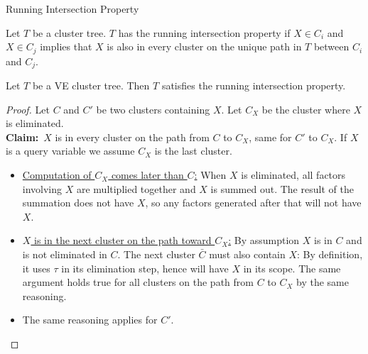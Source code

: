 \begin{frame}{Running Intersection Property}
    \begin{definition}
        Let $T$ be a cluster tree. 
        $T$ has the running intersection property if $X \in C_i$ and $X \in C_j$ implies that $X$ is also in every cluster on the unique path in $T$ between $C_i$ and $C_j$.
    \end{definition}
    \pause
    \begin{theorem}
        \label{thm:ve-cluster-tree-rip}
        Let $T$ be a VE cluster tree. Then $T$ satisfies the running intersection property.
    \end{theorem}
    \pause
    \begin{proof}
        Let $C$ and $C'$ be two clusters containing $X$.
        Let $C_X$ be the cluster where $X$ is eliminated.\\
        \pause 
        \textbf{Claim:}~$X$ is in every cluster on the path from $C$ to $C_X$, same for $C'$ to $C_X$. If $X$ is a query variable we assume $C_X$ is the last cluster.
        \pause
        \begin{itemize}
        \item \underline{Computation of $C_X$ comes later than $C$:} When $X$ is eliminated, all factors involving $X$ are multiplied together and $X$ is summed out.
        \pause 
        The result of the summation does not have $X$, so any factors generated after that will not have $X$.
        \pause \item \underline{$X$ is in the next cluster on the path toward $C_X$:}
        \pause
        By assumption $X$ is in $C$ and is not eliminated in $C$.
        \pause
        The next cluster $\bar{C}$ must also contain $X$: By definition, it uses $\tau$ in its elimination step, hence will have $X$ in its scope.
        \pause 
        The same argument holds true for all clusters on the path from $C$ to $C_X$ by the same reasoning.
        \pause \item The same reasoning applies for $C'$.
        \end{itemize}
    \end{proof}
\end{frame}

